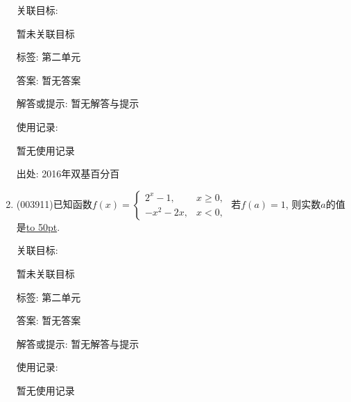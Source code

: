 \documentclass[10pt,a4paper]{article}
\newcommand{\blank}[1]{\underline{\hbox to #1pt{}}}
\begin{document}
\begin{enumerate}[1.]
关联目标:

暂未关联目标



标签: 第二单元

答案: 暂无答案

解答或提示: 暂无解答与提示

使用记录:

暂无使用记录


出处: 2016年双基百分百
\item { (003911)}已知函数$f(x)=\begin{cases}
2^x-1, & x\ge 0,\\ -x^2-2x, & x<0,
\end{cases}$ 若$f(a)=1$, 则实数$a$的值是\blank{50}.


关联目标:

暂未关联目标



标签: 第二单元

答案: 暂无答案

解答或提示: 暂无解答与提示

使用记录:

暂无使用记录



\end{enumerate}
\end{document}
